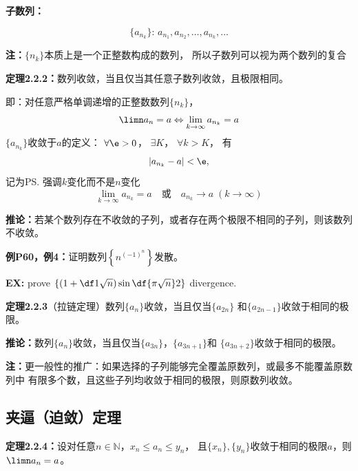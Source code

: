 {\bf 子数列：}

$$\{a_{n_k}\}:\,a_{n_1},a_{n_2},\ldots,a_{n_k},\ldots$$

{\bf 注：}$\{n_k\}$本质上是一个正整数构成的数列，
所以子数列可以视为两个数列的复合

{\bf 定理2.2.2：}数列收敛，当且仅当其任意子数列收敛，且极限相同。

即：对任意严格单调递增的正整数数列$\{n_k\}$，
$$\limn a_n=a\Leftrightarrow\lim_{k\to\infty}a_{n_k}=a$$
$\{a_{n_k}\}$收敛于$a$的定义： $\forall \e>0$， $\exists
{K}$， $\forall {k>K}$， 有 $$|a_{{{n_k}}}-a|<\e,$$
 记为\ps{强调$k$变化而不是$n$变化}
$$\lim\limits_{{k\to\infty}}a_{n_k}=a\quad \mbox{或}\quad a_{n_k}\to
a\;{(k\to\infty)}$$

{\bf 推论：}若某个数列存在不收敛的子列，或者存在两个极限不相同的子列，则该数列不收敛。

{\bf 例P60，例4：}证明数列$\left\{n^{(-1)^n}\right\}$发散。

{\bf EX:} prove $\{\left(1+\df1{\sqrt n}\right)\sin\df{\pi\sqrt n}2\}$
divergence.

{\bf 定理2.2.3}（拉链定理）数列$\{a_n\}$收敛，当且仅当$\{a_{2n}\}$
和$\{a_{2n-1}\}$收敛于相同的极限。

{\bf 推论：}数列$\{a_n\}$收敛，当且仅当$\{a_{3n}\}$，$\{a_{3n+1}\}$和
$\{a_{3n+2}\}$收敛于相同的极限。

{\bf 注：}更一般性的推广：如果选择的子列能够完全覆盖原数列，或最多不能覆盖原数列中
有限多个数，且这些子列均收敛于相同的极限，则原数列收敛。

\subsection{夹逼（迫敛）定理}

{\bf 定理2.2.4：}设对任意$n\in\mathbb{N}$，$x_n\le a_n\le y_n$，
且$\{x_n\},\{y_n\}$收敛于相同的极限$a$，则$\limn a_n=a$。

\begin{center}
\end{center}

